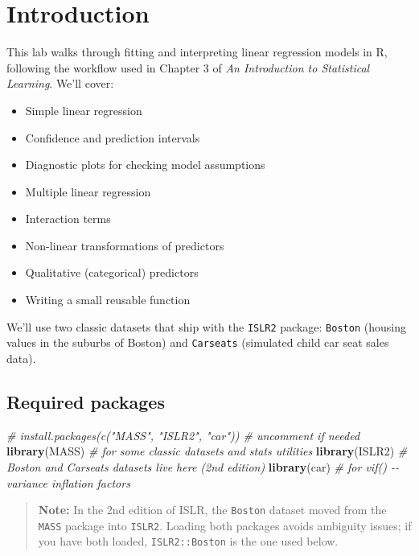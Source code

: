 \documentclass[
  11pt,
]{article}
\author{}
\date{\vspace{-2.5em}}
\newenvironment{Shaded}{\begin{snugshade}}{\end{snugshade}}
\newcommand{\CommentTok}[1]{\textcolor[rgb]{0.56,0.35,0.01}{\textit{#1}}}
\newcommand{\FunctionTok}[1]{\textcolor[rgb]{0.13,0.29,0.53}{\textbf{#1}}}
\newcommand{\NormalTok}[1]{#1}
\providecommand{\tightlist}{%
  \setlength{\itemsep}{0pt}\setlength{\parskip}{0pt}}
\begin{document}

\section{Introduction}\label{introduction}

This lab walks through fitting and interpreting linear regression models
in R, following the workflow used in Chapter 3 of \emph{An Introduction
to Statistical Learning}. We'll cover:

\begin{itemize}
\tightlist
\item
  Simple linear regression
\item
  Confidence and prediction intervals
\item
  Diagnostic plots for checking model assumptions
\item
  Multiple linear regression
\item
  Interaction terms
\item
  Non-linear transformations of predictors
\item
  Qualitative (categorical) predictors
\item
  Writing a small reusable function
\end{itemize}

We'll use two classic datasets that ship with the \texttt{ISLR2}
package: \texttt{Boston} (housing values in the suburbs of Boston) and
\texttt{Carseats} (simulated child car seat sales data).

\subsection{Required packages}\label{required-packages}

\begin{Shaded}
\begin{Highlighting}[]
\CommentTok{\# install.packages(c("MASS", "ISLR2", "car"))  \# uncomment if needed}
\FunctionTok{library}\NormalTok{(MASS)     }\CommentTok{\# for some classic datasets and stats utilities}
\FunctionTok{library}\NormalTok{(ISLR2)    }\CommentTok{\# Boston and Carseats datasets live here (2nd edition)}
\FunctionTok{library}\NormalTok{(car)      }\CommentTok{\# for vif() {-}{-} variance inflation factors}
\end{Highlighting}
\end{Shaded}

\begin{quote}
\textbf{Note:} In the 2nd edition of ISLR, the \texttt{Boston} dataset
moved from the \texttt{MASS} package into \texttt{ISLR2}. Loading both
packages avoids ambiguity issues; if you have both loaded,
\texttt{ISLR2::Boston} is the one used below.
\end{quote}
\end{document}
